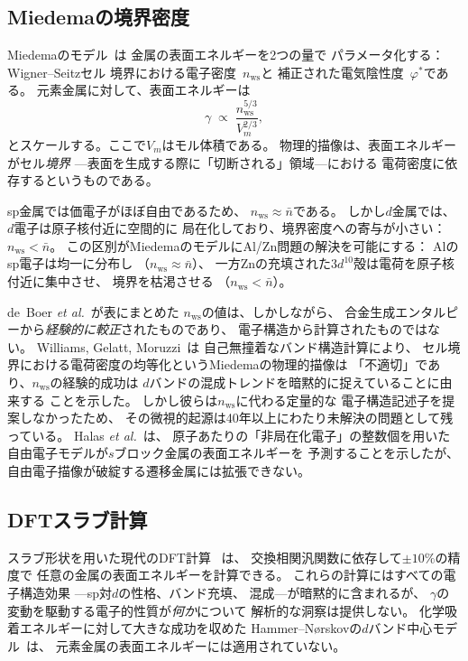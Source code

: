 \documentclass[twocolumn,showpacs,preprintnumbers,amsmath,amssymb,prb]{revtex4-2}
\begin{document}
\subsection{Miedemaの境界密度}

Miedemaのモデル~\cite{Miedema1978,deBoer1988}は
金属の表面エネルギーを2つの量で
パラメータ化する：Wigner--Seitzセル
境界における電子密度~$n_\mathrm{ws}$と
補正された電気陰性度~$\varphi^*$である。
元素金属に対して、表面エネルギーは
\begin{equation}
  \gamma \;\propto\; \frac{n_\mathrm{ws}^{5/3}}{V_m^{2/3}},
  \label{eq:miedema}
\end{equation}
とスケールする。ここで$V_m$はモル体積である。
物理的描像は、表面エネルギーがセル\emph{境界}
---表面を生成する際に「切断される」領域---における
電荷密度に依存するというものである。

sp金属では価電子がほぼ自由であるため、
$n_\mathrm{ws} \approx \bar{n}$である。
しかし$d$金属では、$d$電子は原子核付近に空間的に
局在化しており、境界密度への寄与が小さい：
$n_\mathrm{ws} < \bar{n}$。
この区別がMiedemaのモデルにAl/Zn問題の解決を可能にする：
Alのsp電子は均一に分布し
（$n_\mathrm{ws} \approx \bar{n}$）、
一方Znの充填された$3d^{10}$殻は電荷を原子核付近に集中させ、
境界を枯渇させる
（$n_\mathrm{ws} < \bar{n}$）。

de~Boer \textit{et al.}~\cite{deBoer1988}が表にまとめた
$n_\mathrm{ws}$の値は、しかしながら、
合金生成エンタルピーから\emph{経験的に較正}されたものであり、
電子構造から計算されたものではない。
Williams, Gelatt, Moruzzi~\cite{WilliamsGelattMoruzzi1980}は
自己無撞着なバンド構造計算により、
セル境界における電荷密度の均等化というMiedemaの物理的描像は
「不適切」であり、$n_\mathrm{ws}$の経験的成功は
$d$バンドの混成トレンドを暗黙的に捉えていることに由来する
ことを示した。
しかし彼らは$n_\mathrm{ws}$に代わる定量的な
電子構造記述子を提案しなかったため、
その微視的起源は40年以上にわたり未解決の問題として残っている。
Halas \textit{et al.}~\cite{Halas2002}は、
原子あたりの「非局在化電子」の整数個を用いた
自由電子モデルが$s$ブロック金属の表面エネルギーを
予測することを示したが、
自由電子描像が破綻する遷移金属には拡張できない。

\subsection{DFTスラブ計算}

スラブ形状を用いた現代のDFT計算
~\cite{Vitos1998,SinghMiller2009,Tran2016}は、
交換相関汎関数に依存して$\pm 10\%$の精度で
任意の金属の表面エネルギーを計算できる。
これらの計算にはすべての電子構造効果
---sp対$d$の性格、バンド充填、
混成---が暗黙的に含まれるが、
$\gamma$の変動を駆動する電子的性質が\emph{何か}について
解析的な洞察は提供しない。
化学吸着エネルギーに対して大きな成功を収めた
Hammer--N{\o}rskovの$d$バンド中心モデル~\cite{Hammer1995}は、
元素金属の表面エネルギーには適用されていない。
\end{document}
